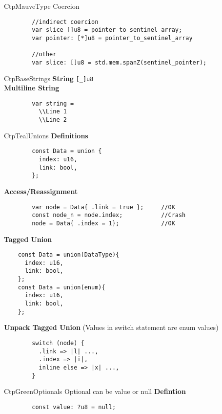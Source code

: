 \documentclass[10pt,a4paper]{article}
\begin{document}
\begin{multicols*}{3}
\begin{mycolorbox}{CtpMauve}{Type Coercion}
\begin{verbatim}
		//indirect coercion
		var slice []u8 = pointer_to_sentinel_array;
		var pointer: [*]u8 = pointer_to_sentinel_array
		
		//other
		var slice: []u8 = std.mem.spanZ(sentinel_pointer);
	\end{verbatim}
\end{mycolorbox}

\begin{mycolorbox}{CtpBase}{Strings}
	\textbf{String} \texttt{[_]u8}\\
	\textbf{Multiline String} \begin{verbatim}
		var string = 
		  \\Line 1
		  \\Line 2
	\end{verbatim}
\end{mycolorbox}



\begin{mycolorbox}{CtpTeal}{Unions}
	\textbf{Definitions}
	\begin{verbatim}
		const Data = union {
		  index: u16,
		  link: bool,
		};
	\end{verbatim}

	\textbf{Access/Reassignment}
	\begin{verbatim}
		var node = Data{ .link = true };     //OK
		const node_n = node.index;           //Crash
		node = Data{ .index = 1};            //OK
	\end{verbatim}

		\textbf{Tagged Union}
	\begin{verbatim}
	const Data = union(DataType){
	  index: u16,
	  link: bool,
	};
	const Data = union(enum){
	  index: u16,
	  link: bool,
	};
	\end{verbatim}

		\textbf{Unpack Tagged Union} (Values in switch statement are enum values)
	\begin{verbatim}
		switch (node) {
		  .link => |l| ...,
		  .index => |i|,
		  inline else => |x| ...,
		}
	\end{verbatim}
\end{mycolorbox}


\begin{mycolorbox}{CtpGreen}{Optionals}
	Optional can be value or null
	\textbf{Defintion}
	\begin{verbatim}
		const value: ?u8 = null;
	\end{verbatim}


\end{mycolorbox}
\end{multicols*}
\end{document}
